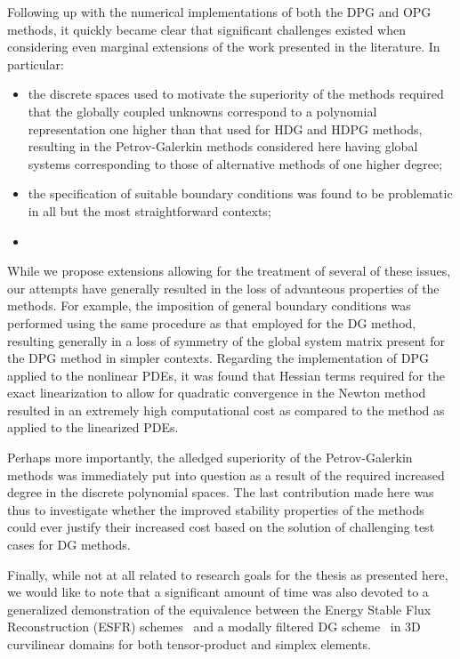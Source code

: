 Following up with the numerical implementations of both the DPG and OPG methods, it quickly
became clear that significant challenges existed when considering even marginal extensions
of the work presented in the literature. In particular:
\begin{itemize}
\item the discrete spaces used to motivate the superiority of the methods
  required that the globally coupled unknowns correspond to a polynomial
  representation one higher than that used for HDG and HDPG methods,
  resulting in the Petrov-Galerkin methods considered here having global systems corresponding
  to those of alternative methods of one higher degree;
\item the specification of suitable boundary conditions was found to be problematic
  in all but the most straightforward contexts;
\item {}
\end{itemize}

While we propose extensions allowing for the treatment of several of these
issues, our attempts have generally resulted in the loss of advanteous
properties of the methods. For example, the imposition of general boundary
conditions was performed using the same procedure as that employed for the DG
method, resulting generally in a loss of symmetry of the global system matrix
present for the DPG method in simpler contexts.
Regarding the implementation of DPG applied to the nonlinear PDEs, it was found
that Hessian terms required for the exact linearization to allow for quadratic
convergence in the Newton method resulted in an extremely high computational
cost as compared to the method as applied to the linearized PDEs.

Perhaps more importantly, the alledged superiority of the Petrov-Galerkin
methods was immediately put into question as a result of the required increased
degree in the discrete polynomial spaces. The last contribution made here was
thus to investigate whether the improved stability properties of the methods
could ever justify their increased cost based on the solution of challenging
test cases for DG methods.

Finally, while not at all related to research goals for the thesis as presented
here, we would like to note that a significant amount of time was also devoted
to a generalized demonstration of the equivalence between the Energy Stable Flux
Reconstruction (ESFR) schemes~\cite{Vincent2011,Williams2014a} and a modally
filtered DG scheme~\cite{Zwanenburg2016} in 3D curvilinear domains for both
tensor-product and simplex elements.

